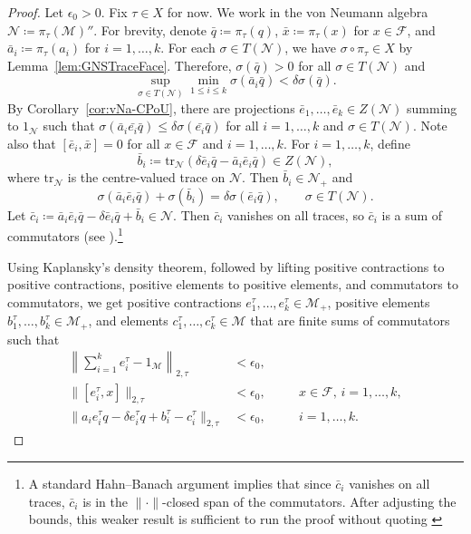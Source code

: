 \documentclass[a4paper,11pt]{amsart}
\theoremstyle{definition}
\numberwithin{equation}{section}
\numberwithin{theorem}{section}
\newcommand{\F}{\mathcal F}
\newcommand{\M}{\mathcal{M}}
\begin{document}
\begin{proof}
    Let $\epsilon_0 > 0$.
     Fix $\tau \in X$ for now. We work in the von Neumann algebra $\mathcal N \coloneqq \pi_\tau(\M)''$. For brevity, denote $\bar{q} \coloneqq \pi_\tau(q)$, $\bar{x}\coloneqq\pi_\tau(x)$ for $x \in \F$, and $\bar{a}_i \coloneqq \pi_\tau(a_i)$ for $i=1,\ldots,k$.
     For each $\sigma \in T(\mathcal N)$, we have $\sigma \circ \pi_\tau \in X$ by Lemma~\ref{lem:GNSTraceFace}.  
     Therefore, $\sigma(\bar{q}) > 0$ for all $\sigma \in T(\mathcal N)$ and
	\begin{equation}
		\sup_{\sigma \in T(\mathcal N)} \min_{1 \leq i \leq k} \sigma(\bar{a}_i\bar{q}) < \delta \sigma(\bar{q}).
	\end{equation}
	By Corollary~\ref{cor:vNa-CPoU}, there are projections $\bar e_1, \ldots, \bar e_k \in Z(\mathcal N)$ summing to $1_{\mathcal N}$ such that $\sigma(\bar{a}_i \bar{e_i}\bar{q}) \leq \delta \sigma(\bar{e_i}\bar{q})$ for all $i = 1, \ldots, k$ and $\sigma\in T(\mathcal N)$.  Note also that $[\bar{e}_i, \bar{x}]=0$ for all $x \in\F$ and $i=1,\ldots,k$. 
    For $i = 1, \ldots, k$, define 
    \begin{equation}
		\bar b_i \coloneqq \mathrm{tr}_{\mathcal N}(\delta \bar{e}_i\bar{q}-\bar{a}_i \bar{e}_i\bar{q}) \in Z(\mathcal N),
    \end{equation}
    where $\mathrm{tr}_{\mathcal N}$ is the centre-valued trace on $\mathcal N$.     Then $\bar b_i \in \mathcal N_+$ and 
    \begin{equation}
		\sigma(\bar{a}_i \bar{e}_i\bar{q}) + \sigma(\bar{b}_i) = \delta \sigma(\bar{e}_i\bar{q}), \qquad  \sigma \in T(\mathcal N).
    \end{equation}
	Let $\bar{c}_i \coloneqq \bar{a}_i \bar{e}_i\bar{q} - \delta\bar{e}_i\bar{q} + \bar{b}_i\in\mathcal N$.  Then $\bar c_i$ vanishes on all traces, so $\bar c_i$ is a sum of commutators (see \cite[Th{\'e}or{\`e}me~2.3]{FH80}).\footnote{A standard Hahn--Banach argument implies that since $\bar c_i$ vanishes on all traces, $\bar c_i$ is in the $\|\cdot\|$-closed span of the commutators.  After adjusting the bounds, this weaker result is sufficient to run the proof without quoting \cite[Th{\'e}or{\`e}me~2.3]{FH80}}  
 
    Using Kaplansky's density theorem, followed by lifting positive contractions to positive contractions, positive elements to positive elements, and commutators to commutators, we get positive contractions $e_1^\tau,\ldots,e_k^\tau \in \M_+$, positive elements $b_1^\tau,\ldots,b_k^\tau \in \M_+$, and elements $c_1^\tau,\ldots,c_k^\tau \in \M$ that are finite sums of commutators such that
       \begin{equation}
       \begin{array}{rlrl}
        \left\|\sum_{i=1}^k e_i^\tau - 1_\M\right\|_{2,\tau} &< \epsilon_0, \quad &&\\
        \|[e_i^\tau,x]\|_{2,\tau} &<\epsilon_0, && x \in \F, \, i = 1, \ldots, k, \\
		\|a_i e_i^\tau q - \delta e_i^\tau q + b_i^\tau-c_i^\tau\|_{2,\tau} &< \epsilon_0,  &&i = 1, \ldots, k.
       \end{array}
    \end{equation}
 


\end{proof}
\end{document}
